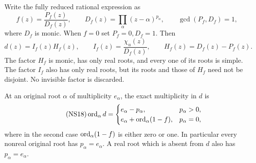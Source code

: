 \documentclass[11pt]{article}
\begin{document}
\begin{sfsectheorem}
\label{sfsec:thm:cancellation}
Write the fully reduced rational expression as
\begin{equation}\tag{NS16}\label{sfsec:NS16}
f(z)=\frac{P_f(z)}{D_f(z)},\qquad
D_f(z)=\prod_\alpha(z-\alpha)^{p_\alpha},\qquad
\gcd(P_f,D_f)=1,
\end{equation}
where $D_f$ is monic. When $f=0$ set $P_f=0,D_f=1$.
Then
\begin{equation}\tag{NS17}\label{sfsec:NS17}
d(z)=I_f(z)H_f(z),\qquad
I_f(z)=\frac{\chi_u(z)}{D_f(z)},\qquad
H_f(z)=D_f(z)-P_f(z).
\end{equation}
The factor $H_f$ is monic, has only real roots, and every
one of its roots is simple. The factor $I_f$ also has only
real roots, but its roots and those of $H_f$ need not be
disjoint. No invisible factor is discarded.

At an original root $\alpha$ of multiplicity $e_\alpha$,
the exact multiplicity in $d$ is
\begin{equation}\tag{NS18}\label{sfsec:NS18}
\operatorname{ord}_\alpha d=
\begin{cases}
e_\alpha-p_\alpha,&p_\alpha>0,\\
e_\alpha+\operatorname{ord}_\alpha(1-f),&p_\alpha=0,
\end{cases}
\end{equation}
where in the second case $\operatorname{ord}_\alpha(1-f)$ is either
zero or one. In particular every nonreal original root
has $p_\alpha=e_\alpha$. A real root which is absent from
$d$ also has $p_\alpha=e_\alpha$.
\end{sfsectheorem}
\end{document}
